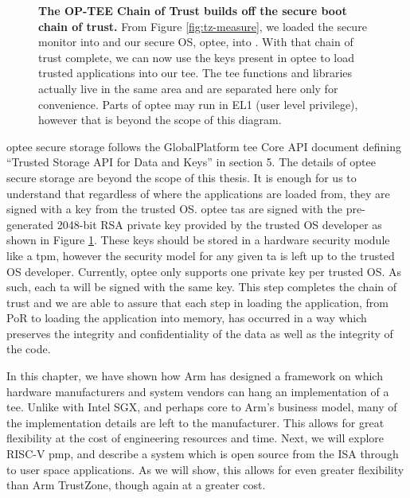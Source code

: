\begin{figure}[ht]
\makebox[\textwidth][c]{
}\caption[OP-TEE Chain of Trust]{\textbf{The OP-TEE Chain of Trust builds off the secure boot chain of trust.} From Figure \ref{fig:tz-measure}, we loaded the secure monitor into \blto and our secure OS, \gls{optee}, into \blttw. With that \gls{chain of trust} complete, we can now use the keys present in \gls{optee} to load trusted applications into our \gls{tee}. The \gls{tee} functions and libraries actually live in the same area and are separated here only for convenience. Parts of \gls{optee} may run in EL1 (user level privilege), however that is beyond the scope of this diagram.
\label{fig:tz-attest}}
\end{figure}

\gls{optee} secure storage follows the GlobalPlatform \gls{tee} Core API document \cite{GPD5} defining ``Trusted Storage API for Data and Keys'' in section 5. The details of \gls{optee} secure storage are beyond the scope of this thesis. It is enough for us to understand that regardless of where the applications are loaded from, they are signed with a key from the trusted OS. \gls{optee} \glspl{ta} are signed with the pre-generated 2048-bit RSA private key provided by the trusted OS developer as shown in Figure \ref{fig:tz-attest}. These keys should be stored in a hardware security module like a \gls{tpm}, however the security model for any given \gls{ta} is left up to the trusted OS developer. Currently, \gls{optee} only supports one private key per trusted OS. As such, each \gls{ta} will be signed with the same key. This step completes the \gls{chain of trust} and we are able to assure that each step in loading the application, from PoR to loading the application into memory, has occurred in a way which preserves the integrity and confidentiality of the data as well as the integrity of the code.

In this chapter, we have shown how Arm has designed a framework on which hardware manufacturers and system vendors can hang an implementation of a \gls{tee}. Unlike with Intel SGX, and perhaps core to Arm's business model, many of the implementation details are left to the manufacturer. This allows for great flexibility at the cost of engineering resources and time. Next, we will explore RISC-V \gls{pmp}, and describe a system which is open source from the ISA through to user space applications. As we will show, this allows for even greater flexibility than Arm TrustZone, though again at a greater cost.
